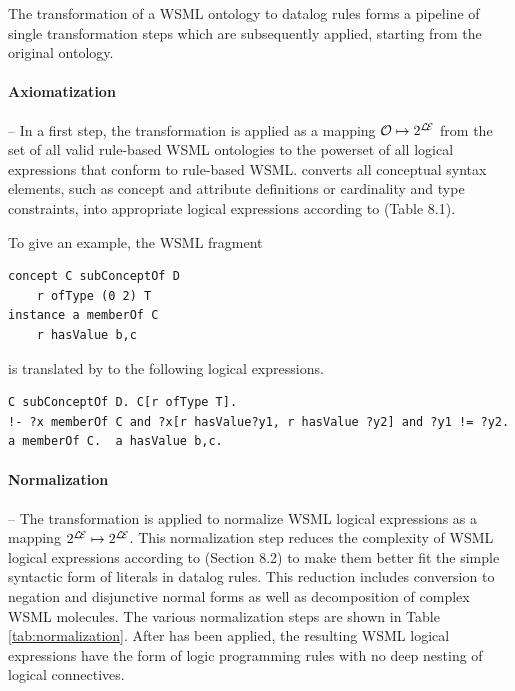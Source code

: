 The transformation of a WSML ontology to datalog rules forms a
pipeline of single transformation steps which are subsequently
applied, starting from the original ontology.

\paragraph{Axiomatization} -- In a first step, the transformation
\transax is applied as a mapping $\mathcal{O} \mapsto 2^{\mathcal{L\!E}}$ from
the set of all valid rule-based WSML ontologies to the powerset of
all logical expressions that conform to rule-based WSML. \transax
converts all conceptual syntax elements, such as concept and
attribute definitions or cardinality and type constraints, into
appropriate logical expressions according to
\cite{wsml-spec}(Table 8.1). 

To give an example, the WSML fragment
\begin{lstlisting}[style=wsml]
concept C subConceptOf D
    r ofType (0 2) T
instance a memberOf C
    r hasValue b,c
\end{lstlisting}
is translated by \transax to the following logical expressions.
\begin{lstlisting}[style=wsml]
C subConceptOf D. C[r ofType T].
!- ?x memberOf C and ?x[r hasValue?y1, r hasValue ?y2] and ?y1 != ?y2.
a memberOf C.  a hasValue b,c.
\end{lstlisting}

\paragraph{Normalization} -- The transformation \transnorm is
applied to normalize WSML logical expressions as a mapping
$2^{\mathcal{L\!E}} \mapsto 2^{\mathcal{L\!E}}$. This normalization step
reduces the complexity of WSML logical expressions according to
\cite{wsml-spec}(Section 8.2) to make them better fit the simple
syntactic form of literals in datalog rules. This reduction
includes conversion to negation and disjunctive normal forms as
well as decomposition of complex WSML molecules. The various
normalization steps are shown in Table \ref{tab:normalization}.
 After \transnorm has
been applied, the resulting WSML logical expressions have the form
of logic programming rules with no deep nesting of logical
connectives.

